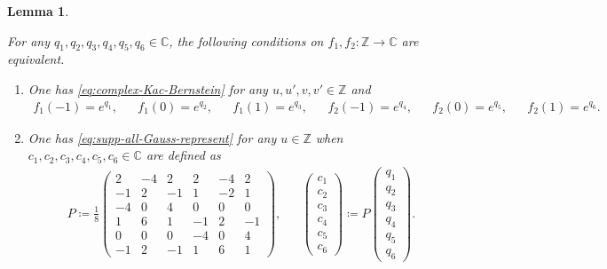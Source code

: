\documentclass[12pt]{article}
\newtheorem{lemma}[theorem]{Lemma}
\theoremstyle{definition}
\theoremstyle{remark}
\numberwithin{equation}{section}
\numberwithin{figure}{section}
\numberwithin{table}{section}
\begin{document}
\begin{lemma}
  \label{lem:supp-all}

For any $ q_1 , q_2 , q_3 , q_4 , q_5 , q_6 \in \mathbb{ C } $, the following conditions on $ f_1 , f_2 \colon \mathbb{ Z } \to \mathbb{ C } $ are equivalent.

\begin{enumerate}
    \item \label{item:supp-all-Kac-Bernstein}

    One has \eqref{eq:complex-Kac-Bernstein} for any $ u , u' , v , v' \in \mathbb{ Z } $ and
    \begin{align}
    f_1 ( - 1 ) = e^{ q_1 } , & &
    f_1 ( 0 ) = e^{ q_2 } , & &
    f_1 ( 1 ) = e^{ q_3 } , & &
    f_2 ( - 1 ) = e^{ q_4 } , & &
    f_2 ( 0 ) = e^{ q_5 } , & &
    f_2 ( 1 ) = e^{ q_6 }. \label{eq:supp-all-Kac-Bernstein-exponent}
\end{align}

\item \label{item:supp-all-Gauss}

One has \eqref{eq:supp-all-Gauss-represent} for any $ u \in \mathbb{ Z } $ when $ c_1 , c_2 , c_3 , c_4 , c_5 , c_6 \in \mathbb{ C } $ are defined as
\begin{align}
    P \coloneqq \frac{ 1 }{ 8 }
    \begin{pmatrix}
    2 & - 4 & 2 & 2 & - 4 & 2 \\
    - 1 & 2 & - 1 & 1 & - 2 & 1 \\
    - 4 & 0 & 4 & 0 & 0 & 0 \\
    1 & 6 & 1 & - 1 & 2 & - 1 \\
    0 & 0 & 0 & - 4 & 0 & 4 \\
    - 1 & 2 & - 1 & 1 & 6 & 1
  \end{pmatrix}, & &
  \begin{pmatrix}
    c_1 \\
    c_2 \\
    c_3 \\
    c_4 \\
    c_5 \\
    c_6
  \end{pmatrix}
  \coloneqq P
  \begin{pmatrix}
    q_1 \\
    q_2 \\
    q_3 \\
    q_4 \\
    q_5 \\
    q_6
  \end{pmatrix}
  .
  \label{eq:supp-all-Gauss-const-def}
\end{align}
    
\end{enumerate}

\end{lemma}
\end{document}
